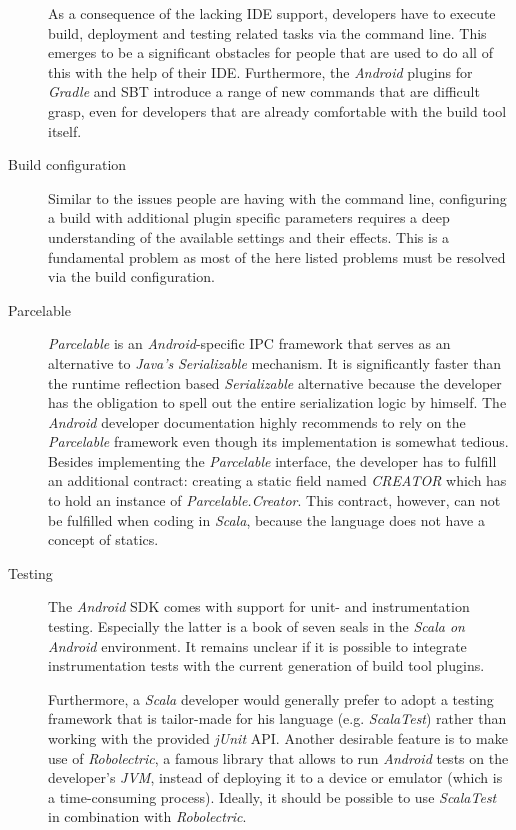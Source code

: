 \begin{description}
	As a consequence of the lacking \ac{IDE} support, developers have to execute build, deployment and testing related tasks via the command line. This emerges to be a significant obstacles for people that are used to do all of this with the help of their \ac{IDE}. Furthermore, the \textit{Android} plugins for \textit{Gradle} and \ac{SBT} introduce a range of new commands that are difficult grasp, even for developers that are already comfortable with the build tool itself.

	\item[Build configuration]\hfill

	Similar to the issues people are having with the command line, configuring a build with additional plugin specific parameters requires a deep understanding of the available settings and their effects. This is a fundamental problem as most of the here listed problems must be resolved via the build configuration.

	\item[Parcelable]\hfill

	\textit{Parcelable} is an \textit{Android}-specific \ac{IPC} framework that serves as an alternative to \textit{Java's} \textit{Serializable} mechanism. It is significantly faster than the runtime reflection based \textit{Serializable} alternative because the developer has the obligation to spell out the entire serialization logic by himself. The \textit{Android} developer documentation highly recommends to rely on the \textit{Parcelable} framework even though its implementation is somewhat tedious. Besides implementing the \textit{Parcelable} interface, the developer has to fulfill an additional contract: creating a static field named \textit{CREATOR} which has to hold an instance of \textit{Parcelable.Creator}. This contract, however, can not be fulfilled when coding in \textit{Scala}, because the language does not have a concept of statics.

	\item[Testing]\hfill

	The \textit{Android} \ac{SDK} comes with support for unit- and instrumentation testing. Especially the latter is a book of seven seals in the \textit{Scala on Android} environment. It remains unclear if it is possible to integrate instrumentation tests with the current generation of  build tool plugins.

	Furthermore, a \textit{Scala} developer would generally prefer to adopt a testing framework that is tailor-made for his language (e.g. \textit{ScalaTest}) rather than working with the provided \textit{jUnit} \ac{API}. Another desirable feature is to make use of \textit{Robolectric}, a famous library that allows to run \textit{Android} tests on the developer's \textit{JVM}, instead of deploying it to a device or emulator (which is a time-consuming process). Ideally, it should be possible to use \textit{ScalaTest} in combination with \textit{Robolectric}.


\end{description}
